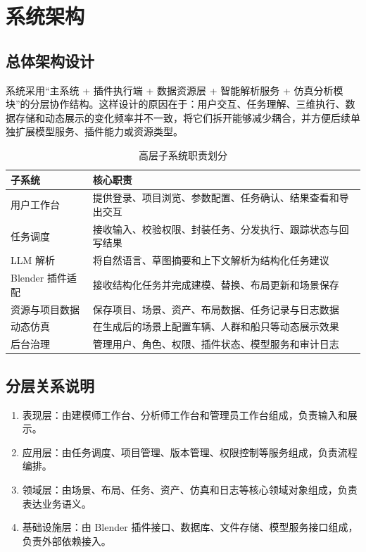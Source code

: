 \section{系统架构}
\label{sec:system_architecture}

\subsection{总体架构设计}
系统采用“主系统 + 插件执行端 + 数据资源层 + 智能解析服务 + 仿真分析模块”的分层协作结构。这样设计的原因在于：用户交互、任务理解、三维执行、数据存储和动态展示的变化频率并不一致，将它们拆开能够减少耦合，并方便后续单独扩展模型服务、插件能力或资源类型。

\begin{table}[t]
\centering
\caption{高层子系统职责划分}
\label{tab:subsystem_responsibilities}
\begin{tabularx}{\textwidth}{p{3.2cm} Y}
\toprule
子系统 & 核心职责 \\
\midrule
用户工作台 & 提供登录、项目浏览、参数配置、任务确认、结果查看和导出交互 \\
任务调度 & 接收输入、校验权限、封装任务、分发执行、跟踪状态与回写结果 \\
LLM 解析 & 将自然语言、草图摘要和上下文解析为结构化任务建议 \\
Blender 插件适配 & 接收结构化任务并完成建模、替换、布局更新和场景保存 \\
资源与项目数据 & 保存项目、场景、资产、布局数据、任务记录与日志数据 \\
动态仿真 & 在生成后的场景上配置车辆、人群和船只等动态展示效果 \\
后台治理 & 管理用户、角色、权限、插件状态、模型服务和审计日志 \\
\bottomrule
\end{tabularx}
\end{table}

\subsection{分层关系说明}
\begin{enumerate}[label=\arabic*.]
    \item 表现层：由建模师工作台、分析师工作台和管理员工作台组成，负责输入和展示。
    \item 应用层：由任务调度、项目管理、版本管理、权限控制等服务组成，负责流程编排。
    \item 领域层：由场景、布局、任务、资产、仿真和日志等核心领域对象组成，负责表达业务语义。
    \item 基础设施层：由 Blender 插件接口、数据库、文件存储、模型服务接口组成，负责外部依赖接入。
\end{enumerate}

